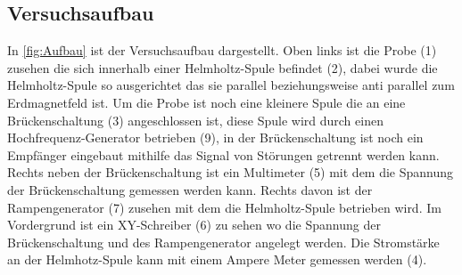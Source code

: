 \subsection{Versuchsaufbau}

In \cref{fig:Aufbau} ist der Versuchsaufbau dargestellt.
Oben links ist die Probe (1) zusehen die sich innerhalb einer Helmholtz-Spule befindet (2), dabei wurde die Helmholtz-Spule so ausgerichtet das sie parallel beziehungsweise anti parallel zum Erdmagnetfeld ist. 
Um die Probe ist noch eine kleinere Spule die an eine Brückenschaltung (3) angeschlossen ist, diese Spule wird durch einen Hochfrequenz-Generator betrieben (9), in der Brückenschaltung ist noch ein Empfänger eingebaut mithilfe das Signal von Störungen getrennt werden kann.
Rechts neben der Brückenschaltung ist ein Multimeter (5) mit dem die Spannung der Brückenschaltung gemessen werden kann.
Rechts davon ist der Rampengenerator (7) zusehen mit dem die Helmholtz-Spule betrieben wird.
Im Vordergrund ist ein XY-Schreiber (6) zu sehen wo die Spannung der Brückenschaltung und des Rampengenerator angelegt werden.
Die Stromstärke an der Helmhotz-Spule kann mit einem Ampere Meter gemessen werden (4).
